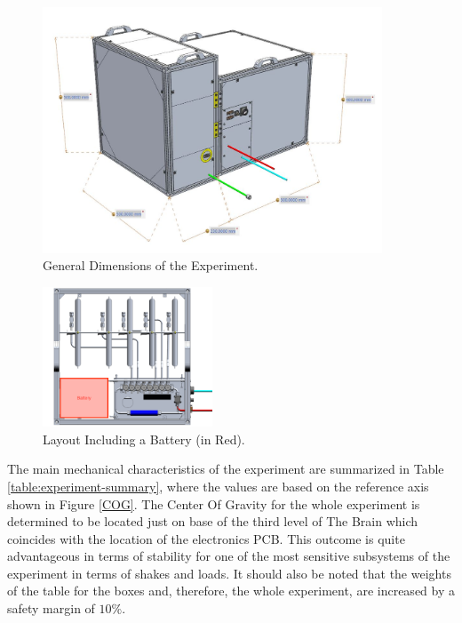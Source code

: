 \documentclass[a4paper,12pt,twoside]{article}
\begin{document}
 \begin{figure}[H]
     \centering
     \includegraphics[width=0.9\textwidth]{4-experiment-design/img/Mechanical/tubular_dimensions.jpg}
     \caption{General Dimensions of the Experiment.}
     \label{dimensions}
\end{figure}

\begin{figure}[H]
    \centering
    \includegraphics[width=0.45\textwidth]{4-experiment-design/img/Mechanical/Battery_Top_View.png}
    \caption{Layout Including a Battery (in Red).}
    \label{battery_distribution}
\end{figure}

The main mechanical characteristics of the experiment are summarized in Table \ref{table:experiment-summary}, where the values are based on the reference axis shown in Figure \ref{COG}. The Center Of Gravity for the whole experiment is determined to be located just on base of the third level of The Brain which coincides with the location of the electronics PCB. This outcome is quite advantageous in terms of stability for one of the most sensitive subsystems of the experiment in terms of shakes and loads. It should also be noted that the weights of the table for the boxes and, therefore, the whole experiment, are increased by a safety margin of $10\%$.
\end{document}
